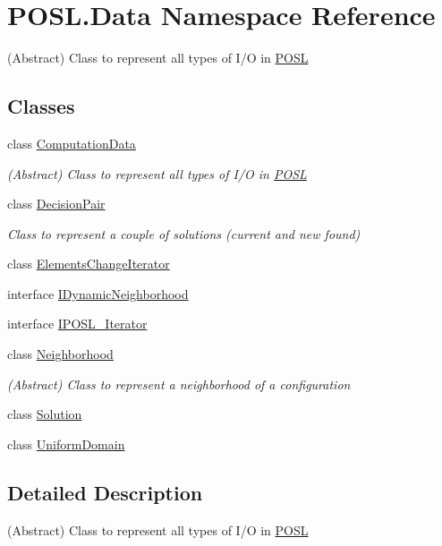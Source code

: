 \hypertarget{namespacePOSL_1_1Data}{}\section{P\+O\+S\+L.\+Data Namespace Reference}
\label{namespacePOSL_1_1Data}


(Abstract) Class to represent all types of I/O in \hyperlink{namespacePOSL}{P\+O\+SL}  


\subsection*{Classes}
\begin{DoxyCompactItemize}
\item 
class \hyperlink{classPOSL_1_1Data_1_1ComputationData}{Computation\+Data}
\begin{DoxyCompactList}\small\item\em (Abstract) Class to represent all types of I/O in \hyperlink{namespacePOSL}{P\+O\+SL} \end{DoxyCompactList}\item 
class \hyperlink{classPOSL_1_1Data_1_1DecisionPair}{Decision\+Pair}
\begin{DoxyCompactList}\small\item\em Class to represent a couple of solutions (current and new found) \end{DoxyCompactList}\item 
class \hyperlink{classPOSL_1_1Data_1_1ElementsChangeIterator}{Elements\+Change\+Iterator}
\item 
interface \hyperlink{interfacePOSL_1_1Data_1_1IDynamicNeighborhood}{I\+Dynamic\+Neighborhood}
\item 
interface \hyperlink{interfacePOSL_1_1Data_1_1IPOSL__Iterator}{I\+P\+O\+S\+L\+\_\+\+Iterator}
\item 
class \hyperlink{classPOSL_1_1Data_1_1Neighborhood}{Neighborhood}
\begin{DoxyCompactList}\small\item\em (Abstract) Class to represent a neighborhood of a configuration \end{DoxyCompactList}\item 
class \hyperlink{classPOSL_1_1Data_1_1Solution}{Solution}
\item 
class \hyperlink{classPOSL_1_1Data_1_1UniformDomain}{Uniform\+Domain}
\end{DoxyCompactItemize}


\subsection{Detailed Description}
(Abstract) Class to represent all types of I/O in \hyperlink{namespacePOSL}{P\+O\+SL} 

